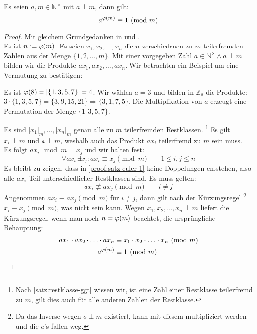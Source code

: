 \begin{satz}
  Es seien $a,m \in \mathbb{N}^\times$ mit $a \perp m$, dann gilt:
  \begin{equation*}
    a^{\varphi(m)} \equiv 1 \pmod{m}
  \end{equation*}
\end{satz}
\begin{proof}
  Mit gleichem Grundgedanken in \parencite{SITE:phi-euler-fermat} und
  \parencite[187-188]{BOOK:numberTheory}. \\
  Es ist $n := \varphi(m)$. Es seien $x_1,x_2,\ldots,x_n$ die $n$ verschiedenen zu
  $m$ teilerfremden Zahlen aus der Menge $\{1,2,\ldots,m\}$.
  Mit einer vorgegeben Zahl
  $a \in \mathbb{N}^\times \wedge a \perp m$ bilden wir die Produkte $ax_1,ax_2,\ldots,ax_n$.
  Wir betrachten ein Beispiel um eine Vermutung zu bestätigen:
  \begin{example}
    Es ist $\varphi(8) = |\{1,3,5,7\}| = 4$. Wir wählen $a = 3$ und bilden in $\mathbb{Z}_8$ die Produkte:
    $3\cdot \{1,3,5,7\} = \{3,9,15,21\} \Rightarrow \{3,1,7,5\}$. Die Multiplikation von $a$ erzeugt eine
    Permutation der Menge $\{1,3,5,7\}$.
  \end{example}
  \noindent
  Es sind $|x_1|_m,\ldots,|x_n|_m$ genau alle zu $m$ teilerfremden Restklassen.
  \footnote{
    Nach \autoref{satz:restklasse-ggt} wissen wir, ist eine Zahl einer Restklasse teilerfremd zu $m$,
    gilt dies auch für alle anderen Zahlen der Restklasse.
  }
  Es gilt $x_i \perp m$ und $a \perp m$, weshalb auch das Produkt $ax_i$ teilerfremd zu $m$ sein muss.\\
  Es folgt $ax_i \mod{m} = x_j$ und wir halten fest:
  \begin{equation}
    \label{proof:satz-euler-1}
    \forall ax_i \, \exists x_j: ax_i \equiv x_j \pmod{m} \qquad 1 \leq i,j \leq n \tag{$*$}
  \end{equation}
  Es bleibt zu zeigen, dass in \eqref{proof:satz-euler-1} keine Doppelungen entstehen,
  also alle $ax_i$ Teil unterschiedlicher Restklassen sind. Es muss gelten:
  \begin{equation*}
    ax_i \not\equiv ax_j \pmod{m} \qquad i \neq j
  \end{equation*}
  Angenommen $ax_i \equiv ax_j \pmod{m}$ für $i \neq j$, dann gilt nach der Kürzungsregel
  \footnote{
    Da das Inverse wegen $a \perp m$ existiert, kann mit diesem multipliziert werden und die $a$'s
    fallen weg.
  }
  $x_i \equiv x_j \pmod{m}$, was nicht sein kann.
  Wegen $x_1,x_2,\ldots,x_n \perp m$ liefert die Kürzungsregel, wenn man noch
  $n = \varphi(m)$ beachtet, die ursprüngliche Behauptung:
  \begin{align*}
    ax_1 \cdot ax_2 \cdot \ldots \cdot ax_n & \equiv
    x_1 \cdot x_2 \cdot \ldots \cdot x_n  \pmod{m}                       \\
    a^{\varphi(m)}                            & \equiv 1 \pmod{m} \qedhere
  \end{align*}
\end{proof}

